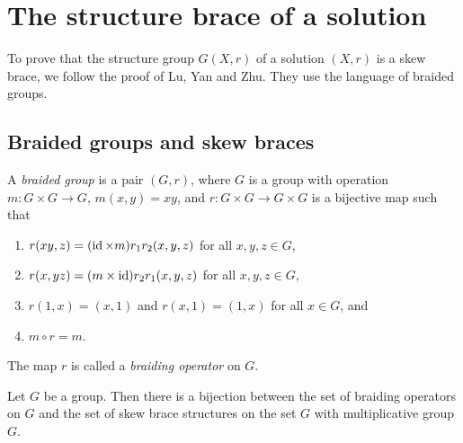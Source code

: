 \chapter{The structure brace of a solution}
\label{structure_brace}


To prove that the structure group $G(X,r)$ of a solution $(X,r)$ is a skew brace, we follow the 
proof of Lu, Yan and Zhu. They use the language of braided groups.

\section*{Braided groups and skew braces}

\begin{definition}
A \emph{braided group} is a pair $(G,r)$, where 
$G$ is a group with operation $m\colon G\times G\to G$, $m(x,y)=xy$, and 
$r\colon G\times G\to G\times G$ is a bijective map such that
\begin{enumerate}
\item $r(xy,z)=(\operatorname{id}\times m)r_1r_2(x,y,z)$ for all $x,y,z\in G$,
\item $r(x,yz)=(m\times\operatorname{id})r_2r_1(x,y,z)$ for all $x,y,z\in G$,
\item $r(1,x)=(x,1)$ and $r(x,1)=(1,x)$ for all $x\in G$, and 
\item $m\circ r=m$.
\end{enumerate}
The map $r$ is called a \emph{braiding operator} on $G$. 
\end{definition}


\begin{theorem}
    Let $G$ be a group. Then there is a bijection between the set of braiding operators on $G$ and the set of skew brace structures on the set $G$ with multiplicative group $G$. 
\end{theorem}

